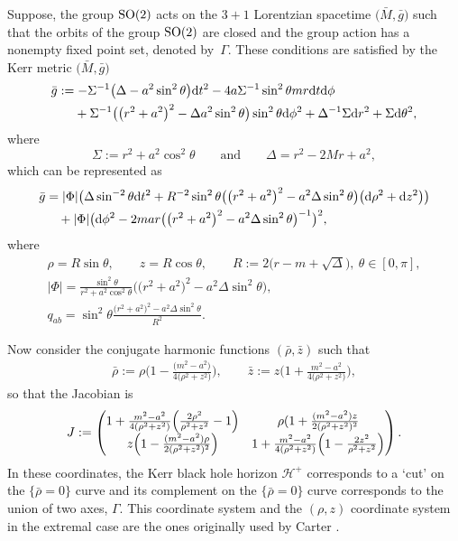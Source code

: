 \documentclass[11pt]{article}
\numberwithin{equation}{section}
\renewcommand{\r}{\rho}
\numberwithin{equation}{section}
\begin{document}
Suppose, the group ${\rm SO}(2)$ acts on the $3+1$ Lorentzian spacetime $\bigl(\bar{M}, \bar{g}\bigr)$ such that the orbits of the group ${\rm SO}(2)$ are closed and the group action has a nonempty fixed point set, denoted by~$\Gamma$. These conditions are satisfied by the Kerr metric $\bigl(\bar{M}, \bar{g}\bigr)$
\begin{align*}
&\bar{g}:= - \Sigma^{-1} \bigl(\Delta -a^2 \sin^2 \theta\bigr) {\rm d}t^2 - 4a\Sigma^{-1} \sin^{2} \theta mr {\rm d}t {\rm d}\phi \notag\\
&\hphantom{\bar{g} :=}{}+ \Sigma^{-1} \bigl(\bigl(r^2 +a^2\bigr)^2-\Delta a^2 \sin^2 \theta\bigr) \sin^2 \theta {\rm d}\phi^2 + \Delta^{-1} \Sigma {\rm d}r^2 + \Sigma {\rm d}\theta^2,
\end{align*}
where
\[
\Sigma := r^2 + a^2 \cos^2 \theta \qquad \text{and} \qquad \Delta = r^2-2Mr + a^2,
\]
which can be represented as
\begin{align*}
\bar{g} &{}= \vert \Phi \vert \bigl(\Delta \sin^{-2} \theta {\rm d}t^2 + R^{-2} \sin^2 \theta \bigl(\bigl(r^2 + a^2\bigr)^2- a^2 \Delta \sin^2 \theta\bigr) \bigl({\rm d} \rho^2 + {\rm d}z^2\bigr)\bigr) \\
&\quad{}+ \vert \Phi \vert \bigl({\rm d}\phi^2 - 2 mar \bigl(\bigl(r^2+a^2\bigr)^2 - a^2 \Delta \sin^2 \theta\bigr)^{-1}\bigr)^2,
\end{align*}
where
\begin{gather*}
\rho = R \sin \theta, \qquad z = R \cos \theta, \qquad R := 2 \bigl(r-m + \sqrt{\Delta}\bigr), \ \theta \in [0, \pi],
\\
	\vert \Phi \vert = \frac{\sin^2 \theta }{r^2 +a^2 \cos^2 \theta} \bigl( \bigl(r^2+a^2\bigr)^2 -a^2 \Delta \sin^2 \theta \bigr), \\
	q_{ab} = \sin^2 \theta \frac{ \bigl(r^2+a^2\bigr)^2 -a^2 \Delta \sin^2 \theta }{R^2}.
\end{gather*}


Now consider the conjugate harmonic functions $(\bar{\rho}, \bar{z})$ such that
\begin{align*}
\bar{\rho} := \rho \biggl(1- \frac{\bigl(m^2-a^2\bigr)}{4 \bigl(\rho^2 + z^2\bigr)}\biggr), \qquad \bar{z} := z \biggl(1+ \frac{m^2-a^2}{4 \bigl(\rho^2 + z^2\bigr)}\biggr),
\end{align*}
so that the Jacobian is
\begin{align*}
J := \begin{pmatrix} 1 + \frac{m^2-a^2}{4 (\r^2 + z^2)} \Bigl( \frac{2 \r^2}{ \r^2 +z^2} -1\Bigr) & \r (1 + \frac{(m^2-a^2)z}{2 (\r^2 +z^2)^2} \\
z \Bigl(1- \frac{ (m^2-a^2) \r}{ 2 (\r^2 + z^2)^2}\Bigr) & 1+ \frac{m^2-a^2}{4 (\r^2 +z^2)} \Bigl(1- \frac{2 z^2}{\r^2 +z^2} \Bigr)
\end{pmatrix}.
\end{align*}
In these coordinates, the Kerr black hole horizon $\mathcal{H}^+$ corresponds to a `cut' on the $\{ \bar{\rho} =0\}$ curve and its complement on the $\{\bar{\rho} =0\}$ curve corresponds to the union of two axes, $\Gamma$. This coordinate system and the $(\rho, z)$ coordinate system in the extremal case are the ones originally used by Carter \cite{Car_71}.
\end{document}
